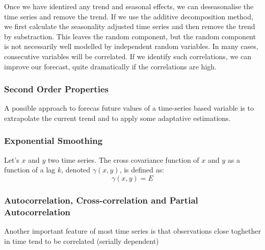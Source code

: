 \begin{definition}
    
\end{definition}

{\color{red} Once we have identired any trend and seasonal effects, we can deseasonalise the time series and remove the trend. If we use the additive decomposition method, we first calculate the seasonality adjusted time series and then remove the trend by substraction. This leaves the random component, but the random component is not necessarily well modelled by independent random variables. In many cases, consecutive variables will be correlated. If we identify such correlations, we can improve our forecast, quite dramatically if the correlations are high.}

\subsubsection{Second Order Properties}

A possible approach to forecas future values of a time-series based variable is to extrapolate the current trend and to apply some adaptative estimations.


\subsubsection{Exponential Smoothing}

\begin{definition}
Let's $x$ and $y$ two time series. The cross covariance function of $x$ and $y$ as a function of a lag $k$, denoted $\gamma \left( x, y \right)$, is defined as:
\[
    \gamma \left( x, y \right) = E 
\] 

\end{definition}

\begin{definition}

\end{definition}

%
% 
\subsubsection{Autocorrelation, Cross-correlation and Partial Autocorrelation}
\label{sub:autocorrelation}

{\color{red} Another important feature of most time series is that observations close toghether in time tend to be correlated (serially dependent)}

